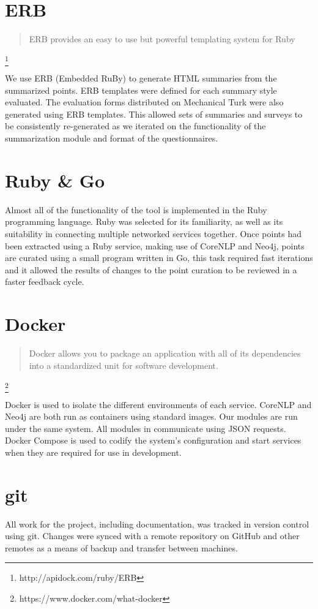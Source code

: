   \tocless\section{ERB}
    \blockquote{ERB provides an easy to use but powerful templating system for Ruby}\footnote{http://apidock.com/ruby/ERB}

    We use ERB (Embedded RuBy) to generate HTML summaries from the summarized points. ERB templates were defined for each summary style evaluated. The evaluation forms distributed on Mechanical Turk were also generated using ERB templates. This allowed sets of summaries and surveys to be consistently re-generated as we iterated on the functionality of the summarization module and format of the questionnaires.

  \tocless\section{Ruby \& Go}
    Almost all of the functionality of the tool is implemented in the Ruby programming language. Ruby was selected for its familiarity, as well as its suitability in connecting multiple networked services together. Once points had been extracted using a Ruby service, making use of CoreNLP and Neo4j, points are curated using a small program written in Go, this task required fast iterations and it allowed the results of changes to the point curation to be reviewed in a faster feedback cycle.

  \tocless\section{Docker}
    \blockquote{Docker allows you to package an application with all of its dependencies into a standardized unit for software development.}\footnote{https://www.docker.com/what-docker}

    Docker is used to isolate the different environments of each service. CoreNLP and Neo4j are both run as containers using standard images. Our modules are run under the same system. All modules in communicate using JSON requests. Docker Compose is used to codify the system's configuration and start services when they are required for use in development.

  \tocless\section{git}
    All work for the project, including documentation, was tracked in version control using git. Changes were synced with a remote repository on GitHub and other remotes as a means of backup and transfer between machines.
